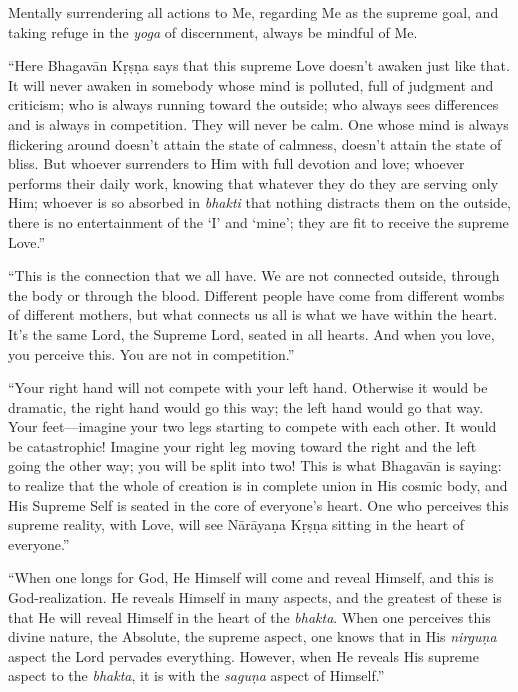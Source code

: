 {Mentally surrendering all actions to Me, regarding Me as the supreme goal, and taking refuge in the \textit{yoga} of discernment, always be mindful of Me.}

\enquote{Here Bhagavān Kṛṣṇa says that this supreme Love doesn’t awaken just like that. It will never awaken in somebody whose mind is polluted, full of judgment and criticism; who is always running toward the outside; who always sees differences and is always in competition. They will never be calm. One whose mind is always flickering around doesn’t attain the state of calmness, doesn’t attain the state of bliss. But whoever surrenders to Him with full devotion and love; whoever performs their daily work, knowing that whatever they do they are serving only Him; whoever is so absorbed in \textit{bhakti} that nothing distracts them on the outside, there is no entertainment of the \enquote{I} and \enquote{mine}; they are fit to receive the supreme Love.}

\enquote{This is the connection that we all have. We are not connected outside, through the body or through the blood. Different people have come from different wombs of different mothers, but what connects us all is what we have within the heart. It’s the same Lord, the Supreme Lord, seated in all hearts. And when you love, you perceive this. You are not in competition.}

\enquote{Your right hand will not compete with your left hand. Otherwise it would be dramatic, the right hand would go this way; the left hand would go that way. Your feet---imagine your two legs starting to compete with each other. It would be catastrophic! Imagine your right leg moving toward the right and the left going the other way; you will be split into two! This is what Bhagavān is saying: to realize that the whole of creation is in complete union in His cosmic body, and His Supreme Self is seated in the core of everyone’s heart. One who perceives this supreme reality, with Love, will see Nārāyaṇa Kṛṣṇa sitting in the heart of everyone.}

\enquote{When one longs for God, He Himself will come and reveal Himself, and this is God-realization. He reveals Himself in many aspects, and the greatest of these is that He will reveal Himself in the heart of the \textit{bhakta}. When one perceives this divine nature, the Absolute, the supreme aspect, one knows that in His \textit{nirguṇa} aspect the Lord pervades everything. However, when He reveals His supreme aspect to the \textit{bhakta}, it is with the \textit{saguṇa} aspect of Himself.}

